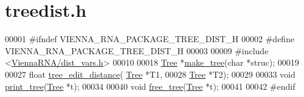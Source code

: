 \hypertarget{treedist_8h_source}{\section{treedist.\+h}
\label{treedist_8h_source}
}

\begin{DoxyCode}
00001 \textcolor{preprocessor}{#ifndef VIENNA\_RNA\_PACKAGE\_TREE\_DIST\_H}
00002 \textcolor{preprocessor}{#define VIENNA\_RNA\_PACKAGE\_TREE\_DIST\_H}
00003 
00009 \textcolor{preprocessor}{#include <\hyperlink{dist__vars_8h}{ViennaRNA/dist\_vars.h}>}
00010 
00018 \hyperlink{structTree}{Tree}   *\hyperlink{treedist_8h_a08fe4d5afd385dce593b86eaf010c6e3}{make\_tree}(\textcolor{keywordtype}{char} *struc);
00019 
00027 \textcolor{keywordtype}{float}   \hyperlink{treedist_8h_a3b21f1925f7071f46d93431a835217bb}{tree\_edit\_distance}( \hyperlink{structTree}{Tree} *T1,
00028                             \hyperlink{structTree}{Tree} *T2);
00029 
00033 \textcolor{keywordtype}{void}    \hyperlink{treedist_8h_a21ad4de3ba4055aeef08b28c9ad48894}{print\_tree}(\hyperlink{structTree}{Tree} *t);
00034 
00040 \textcolor{keywordtype}{void}    \hyperlink{treedist_8h_acbc1cb9bce582ea945e4a467c76a57aa}{free\_tree}(\hyperlink{structTree}{Tree} *t);
00041 
00042 \textcolor{preprocessor}{#endif}
\end{DoxyCode}
